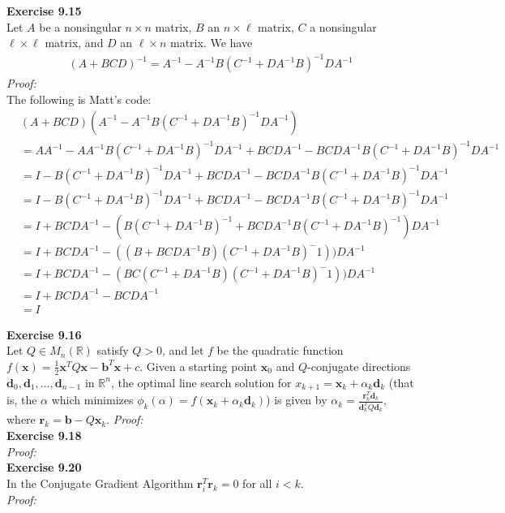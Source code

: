 \documentclass[letterpaper,12pt]{article}
\let\vec\mathbf
\theoremstyle{definition}
\begin{document}
\textbf{Exercise 9.15} \\
Let $A$ be a nonsingular $n \times n$ matrix, $B$ an $n \times \ell$ matrix, $C$ a nonsingular $\ell \times \ell$ matrix, and $D$ an $\ell \times n$ matrix. We have
\begin{align*}
  (A + BCD)^{-1} = A^{-1} - A^{-1} B(C^{-1} + DA^{-1}B)^{-1}DA^{-1}
\end{align*}
\textit{Proof:} \\
The following is Matt's code:
\begin{align*}
  &(A+BCD)(A^{-1} - A^{-1}B(C^{-1} + DA^{-1}B)^{-1}DA^{-1}) \\
  &= AA^{-1} - AA^{-1}B(C^{-1} + DA^{-1}B)^{-1}DA^{-1} + BCDA^{-1} - BCDA^{-1}B(C^{-1} + DA^{-1}B)^{-1}DA^{-1} \\
  &= I - B(C^{-1} + DA^{-1}B)^{-1}DA^{-1} + BCDA^{-1} - BCDA^{-1}B(C^{-1} + DA^{-1}B)^{-1}DA^{-1} \\
  &= I - B(C^{-1} + DA^{-1}B)^{-1}DA^{-1} + BCDA^{-1} - BCDA^{-1}B(C^{-1} + DA^{-1}B)^{-1}DA^{-1} \\
  &= I + BCDA^{-1} - (B(C^{-1} + DA^{-1}B)^{-1} + BCDA^{-1}B(C^{-1} + DA^{-1}B)^{-1})DA^{-1} \\
  &= I + BCDA^{-1} - ((B+BCDA^{-1}B)(C^{-1} + DA^{-1}B)^-{1}))DA^{-1} \\
  &= I + BCDA^{-1} - (BC(C^{-1}+DA^{-1}B)(C^{-1} + DA^{-1}B)^-{1}))DA^{-1} \\
  &= I + BCDA^{-1} - BCDA^{-1} \\
  &= I
\end{align*}

\textbf{Exercise 9.16} \\
Let $Q \in M_n(\mathbb{R})$ satisfy $Q > 0$, and let $f$ be the quadratic function $f(\vec{x}) = \frac{1}{2}\vec{x}^TQ\vec{x} - \vec{b}^T\vec{x} + c$. Given a starting point $\vec{x}_0$ and $Q$-conjugate directions $\vec{d}_0, \vec{d}_1, ..., \vec{d}_{n-1}$ in $\mathbb{R}^n$, the optimal line search solution for $x_{k+1} = \vec{x}_k + \alpha_k \vec{d}_k$ (that is, the $\alpha$ which minimizes $\phi_k(\alpha) = f(\vec{x}_k+\alpha_k \vec{d}_k)$) is given by $\alpha_k = \frac{\vec{r}_k^T \vec{d}_k}{\vec{d}_k^T Q \vec{d}_k}$, where $\vec{r}_k = \vec{b} - Q\vec{x}_k$.
\textit{Proof:} \\

\textbf{Exercise 9.18} \\
\textit{Proof:} \\

\textbf{Exercise 9.20} \\
In the Conjugate Gradient Algorithm $\vec{r}_i^T\vec{r}_k=0$ for all $i < k$. \\
\textit{Proof:} \\
\end{document}
